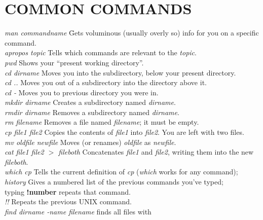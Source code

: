 \documentclass[]{article}
\begin{document}
\eject

\section{COMMON COMMANDS}\label{commands}
\vspace{-0.2in}

\begin{tabbing}
{\it man commandname} \hspace{0.7in} \= Gets voluminous (usually overly so) info for you on a specific command. \\
{\it apropos topic} \> Tells which commands are
relevant to the {\it topic}. \\
{\it pwd} \> Shows your ``present working directory''. \\
{\it cd dirname} \> Moves you into the subdirectory, below your 
present directory. \\
{\it cd ..} \> Moves you out of a subdirectory into the directory above
it. \\
{\it cd -} \> Moves you to previous directory you were in. \\
{\it mkdir dirname} \> Creates a subdirectory named {\it dirname}. \\
{\it rmdir dirname} \> Removes a subdirectory named {\it dirname}. \\
{\it rm filename} \> Removes a file named {\it filename}; it must
be empty. \\ 
{\it cp file1 file2} \> Copies the contents of {\it file1} into 
{\it file2}. You are left with two files. \\
{\it mv oldfile newfile} \> Moves (or renames) {\it oldfile} as 
{\it newfile}. \\
{\it cat file1 file2 $>$ fileboth} \> Concatenates {\it file1} and {\it
file2}, writing them into the new {\it fileboth}. \\
{\it which cp} \> Tells the current definition of {\it cp} ({\it which}
works for any command); \\
{\it history} \> Gives a numbered list of the previous commands you've
typed; \\
\> typing {\bf !number} repeats that command. \\
{\it !!} \> Repeats the previous UNIX command. \\
{\it find dirname -name filename} \> finds all files with {\it
}
\end{tabbing}
\end{document}
